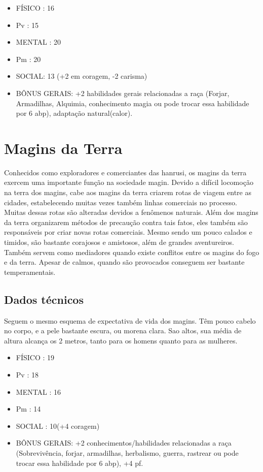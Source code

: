\begin{itemize}


\item FÍSICO : 16
\item Pv : 15 

\item MENTAL : 20
\item Pm : 20

\item SOCIAL: 13 (+2 em coragem, -2 carisma)

\item BÔNUS GERAIS: +2 habilidades gerais relacionadas a raça (Forjar, Armadilhas, Alquimia, conhecimento magia ou pode trocar essa habilidade por 6 abp), adaptação natural(calor).


\end{itemize}


\section{Magins da Terra}

Conhecidos como exploradores e comerciantes das hanrusi, os magins da terra exercem uma importante função na sociedade magin. Devido a difícil locomoção na terra dos magins, cabe aos magins da terra criarem rotas de viagem entre as cidades, estabelecendo muitas vezes também linhas comerciais no processo. Muitas dessas rotas são alteradas devidos a fenômenos naturais. Além dos magins da terra organizarem métodos de precaução contra tais fatos, eles também são responsáveis por criar novas rotas comerciais. Mesmo sendo um pouco calados e timidos, são bastante corajosos e amistosos, além de grandes aventureiros. Também servem como mediadores quando existe conflitos entre os magins do fogo e da terra. Apesar de calmos, quando são provocados conseguem ser bastante temperamentais.

\subsection{Dados técnicos}


Seguem o mesmo esquema de expectativa de vida dos magins. Têm pouco cabelo no corpo, e a pele bastante escura, ou morena clara. Sao altos, sua média de altura alcança os 2 metros, tanto para os homens quanto para as mulheres. 



\begin{itemize}


\item FÍSICO : 19
\item Pv : 18 

\item MENTAL : 16
\item Pm : 14

\item SOCIAL : 10(+4 coragem)

\item BÔNUS GERAIS: +2 conhecimentos/habilidades relacionadas a raça (Sobrevivência, forjar, armadilhas, herbalismo, guerra, rastrear ou pode trocar essa habilidade por 6 abp), +4 pf. 


\end{itemize}

